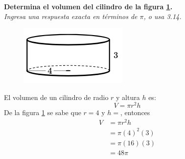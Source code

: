 \textbf{Determina el volumen del cilindro de la figura \ref{fig:vol_cil_03}.}\\
\textit{Ingresa una respuesta exacta en términos de $\pi$, o usa 3.14.}\\

\begin{minipage}[t]{0.3\linewidth}
    \begin{figure}[H]
        \centering
        \includegraphics[width=\textwidth]{../images/vol_cil_03.png}
        \caption{}
        \label{fig:vol_cil_03}
    \end{figure}
\end{minipage}%
\begin{minipage}[t]{0.7\linewidth}
    \begin{solutionbox}{5cm}        El volumen de un cilindro de radio $r$ y altura $h$ es:
        \begin{equation*}
            V = \pi r^2 h
        \end{equation*}
        De la figura \ref{fig:vol_cil_03} se sabe que $r=4$ y $h=$, entonces
        \begin{equation*}
            \begin{split}
                V & = \pi r^2 h\\
                & = \pi (4)^2 (3)\\
                & = \pi (16) (3)\\
                & = 48\pi
            \end{split}
        \end{equation*}
    \end{solutionbox}
\end{minipage}%
